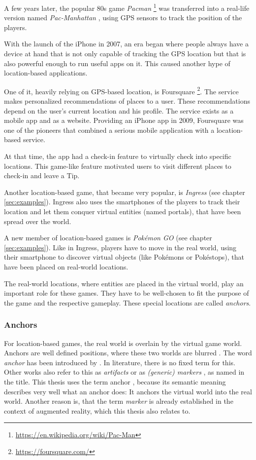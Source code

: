 A few years later, the popular 80s game \emph{Pacman} \footnote{\url{https://en.wikipedia.org/wiki/Pac-Man}} was transferred into a real-life version named \emph{Pac-Manhattan} \citep{Pac-Manhattan}, using GPS sensors to track the position of the players.

With the launch of the iPhone in 2007, an era began where people always have a device at hand that is not only capable of tracking the GPS location but that is also powerful enough to run useful apps on it. This caused another hype of location-based applications.

One of it, heavily relying on GPS-based location, is Foursquare \footnote{\url{https://foursquare.com/}}. The service makes personalized recommendations of places to a user. These recommendations depend on the user's current location and his profile. The service exists as a mobile app and as a website. Providing an iPhone app in 2009, Foursquare was one of the pioneers that combined a serious mobile application with a location-based service.

At that time, the app had a check-in feature to virtually check into specific locations. This game-like feature motivated users to visit different places to check-in and leave a Tip.

Another location-based game, that became very popular, is \emph{Ingress} (see chapter \ref{sec:examples}). Ingress also uses the smartphones of the players to track their location and let them conquer virtual entities (named portals), that have been spread over the world.

A new member of location-based games is \emph{Pok\'{e}mon GO} (see chapter \ref{sec:examples}). Like in Ingress, players have to move in the real world, using their smartphone to discover virtual objects (like Pok\'{e}mons or Pok\'{e}stops), that have been placed on real-world locations.

The real-world locations, where entities are placed in the virtual world, play an important role for these games. They have to be well-chosen to fit the purpose of the game and the respective gameplay. These special locations are called \emph{anchors}.

\subsubsection{Anchors}\label{sec:anchorsStateOfTheArt}
For location-based games, the real world is overlain by the virtual game world. Anchors are well defined positions, where these two worlds are blurred \citep{hock2014augmented}. The word \emph{anchor} has been introduced by \citeauthor{hock2014augmented}. In literature, there is no fixed term for this. Other works also refer to this as \emph{artifacts} \citep{reid2008design} or as \emph{(generic) markers} \citep{matyas2008designing}, as named in the title. This thesis uses the term anchor \citep{hock2014augmented}, because its semantic meaning describes very well what an anchor does: It anchors the virtual world into the real world. Another reason is, that the term \emph{marker} is already established in the context of augmented reality, which this thesis also relates to.

